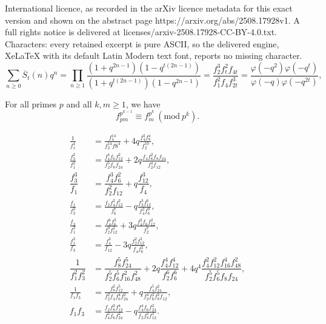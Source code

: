 \documentclass[10pt,a4paper]{amsart}
\begin{document}
International licence, as recorded in the arXiv licence metadata for this exact version and shown on the abstract page https://arxiv.org/abs/2508.17928v1. A full rights notice is delivered at licenses/arxiv-2508.17928-CC-BY-4.0.txt. Characters: every retained excerpt is pure ASCII, so the delivered engine, XeLaTeX with its default Latin Modern text font, reports no missing character.
\begin{equation}
 \sum_{n\geq 0} \overline{S}_{t}(n)q^{n}=\prod_{n\geq 1}\dfrac{(1+q^{2n-1})(1-q^{t(2n-1)})}{(1+q^{t(2n-1)})(1-q^{2n-1})}=\dfrac{f_{2}^{3}f_{t}^{2}f_{4t}}{f_{1}^{2}f_{4}f_{2t}^{3}}=\frac{\varphi(-q^2)\varphi(-q^t)}{\varphi(-q)\varphi(-q^{2t})},  \label{maineq}
\end{equation}

\begin{lemma} \label{binomial} 
For all primes $p$ and all $k, m\geq 1$, we have 
\begin{equation}
 f_{pm}^{p^{k-1}} \equiv f_{m}^{p^{k}}  \ (\mathrm{mod} \ p^{k}). \label{binomiallemma} 
\end{equation}
\end{lemma}

\begin{align}
\frac{1}{f_1^4} &= \frac{f_4^{14}}{f_2^{14}f8^4}+4q\frac{f_4^2f_8^4}{f_2^{10}},\label{diss-2-f14}\\
\frac{f_{3}^{2}}{f_{1}^{2}} &=\frac{f_{4}^{4}f_{6}f_{12}^{2}}{f_{2}^{5}f_{8}f_{24}}+2q\frac{f_{4}f_{6}^{2}f_{8}f_{24}}{f_{2}^{4}f_{12}}, \label{lemma1.1}\\
\dfrac{f_{3}^{3}}{f_{1}} &=\dfrac{f_{4}^{3}f_{6}^{2}}{f_{2}^{2}f_{12}}+q\dfrac{f_{12}^{3}}{f_{4}}, \label{lemma1.2}\\
\frac{f_{1}}{f_{3}^{3}} &=\frac{f_{2} f_{4}^{2} f_{12}^{2}}{f_{6}^{7}} -q \frac{f_{2}^{3} f_{12}^{6}}{f_{4}^{2} f_{6}^{9}}, \label{lemma1.3}\\
\frac{f_{3}}{f_{1}^{3}} &=\frac{f_{4}^{6} f_{6}^{3}}{f_{2}^{9} f_{12}^{2}} +3q \frac{f_{4}^{2} f_{6} f_{12}^{2}}{f_{2}^{7}}, \label{lemma1.4}\\
\frac{f_{1}^{3}}{f_{3}} &=\frac{f_{4}^{3}}{f_{12}} -3q \frac{f_{2}^{2} f_{12}^{3} }{ f_{4} f_{6}^{2}}, \label{lemma1.41}\\
\dfrac{1}{f_{1}^{2} f_{3}^{2}} &= \dfrac{f_{8}^{5} f_{24}^{5}}{f_{2}^{5} f_{6}^{5} f_{16}^{2} f_{48}^{2}} +2q \dfrac{f_{4}^{4} f_{12}^{4}}{f_{2}^{6} f_{6}^{6}} +4q^{4} \dfrac{f_{4}^{2} f_{12}^{2} f_{16}^{4} f_{48}^{2}}{f_{2}^{5} f_{6}^{5} f_{8} f_{24}}, \label{lemma1.5}\\
\frac{1}{f_{1} f_{3}} &= \frac{f_{8}^{2} f_{12}^{5}}{f_{2}^{2} f_{4} f_{6}^{4} f_{24}^{2}}+q \frac{f_{4}^{5} f_{24}^{2}}{f_{2}^{4} f_{6}^{2} f_{8}^{2} f_{12}},\label{lemma1.6}\\
f_{1}f_{3} &= \frac{f_{2} f_{8}^{2} f_{12}^{4}}{f_{4}^{2} f_{6} f_{24}^{2}}-q \frac{f_{4}^{4} f_{6} f_{24}^{2}}{f_{2} f_{8}^{2} f_{12}^{2}}. \label{lemma1.7}
\end{align}
\end{document}
